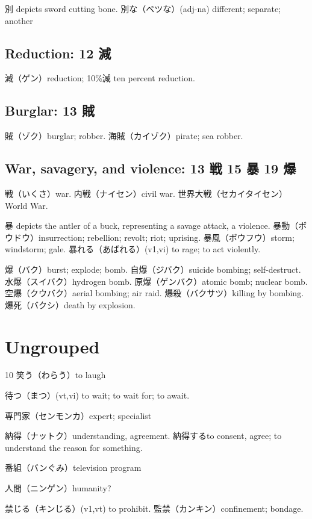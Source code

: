 別 depicts sword cutting bone.
別な（ベツな）(adj-na) different; separate; another

\subsection{Reduction: 12 減}

減（ゲン）reduction; 10\%減 ten percent reduction.

\subsection{Burglar: 13 賊}

賊（ゾク）burglar; robber.
海賊（カイゾク）pirate; sea robber.

\subsection{War, savagery, and violence: 13 戦 15 暴 19 爆}

戦（いくさ）war.
内戦（ナイセン）civil war.
世界大戦（セカイタイセン）World War.

暴 depicts the antler of a buck, representing a savage attack, a violence.
暴動（ボウドウ）insurrection; rebellion; revolt; riot; uprising.
暴風（ボウフウ）storm; windstorm; gale.
暴れる（あばれる）(v1,vi) to rage; to act violently.

爆（バク）burst; explode; bomb.
自爆（ジバク）suicide bombing; self-destruct.
水爆（スイバク）hydrogen bomb.
原爆（ゲンバク）atomic bomb; nuclear bomb.
空爆（クウバク）aerial bombing; air raid.
爆殺（バクサツ）killing by bombing.
爆死（バクシ）death by explosion.

\section{Ungrouped}

10 笑う（わらう）to laugh

待つ（まつ）(vt,vi) to wait; to wait for; to await.

専門家（センモンカ）expert; specialist

納得（ナットク）understanding, agreement.
納得するto consent, agree; to understand the reason for something.

番組（バンぐみ）television program

人間（ニンゲン）humanity?

禁じる（キンじる）(v1,vt) to prohibit.
監禁（カンキン）confinement; bondage.

